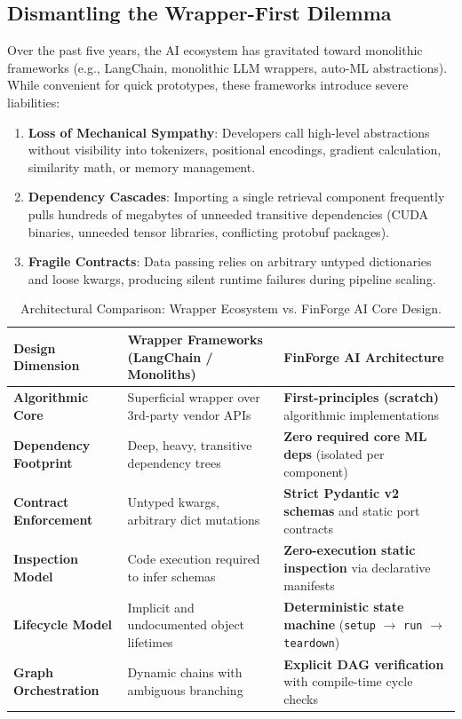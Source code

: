\documentclass[11pt,a4paper]{article}
\begin{document}
\subsection{Dismantling the Wrapper-First Dilemma}
Over the past five years, the AI ecosystem has gravitated toward monolithic frameworks (e.g., LangChain, monolithic LLM wrappers, auto-ML abstractions). While convenient for quick prototypes, these frameworks introduce severe liabilities:
\begin{enumerate}[leftmargin=1.5em, itemsep=2pt]
    \item \textbf{Loss of Mechanical Sympathy}: Developers call high-level abstractions without visibility into tokenizers, positional encodings, gradient calculation, similarity math, or memory management.
    \item \textbf{Dependency Cascades}: Importing a single retrieval component frequently pulls hundreds of megabytes of unneeded transitive dependencies (CUDA binaries, unneeded tensor libraries, conflicting protobuf packages).
    \item \textbf{Fragile Contracts}: Data passing relies on arbitrary untyped dictionaries and loose kwargs, producing silent runtime failures during pipeline scaling.
\end{enumerate}

\begin{table}[h!]
\centering
\small
\begin{tabularx}{\textwidth}{p{3.2cm} X X}
\toprule
\textbf{Design Dimension} & \textbf{Wrapper Frameworks (LangChain / Monoliths)} & \textbf{FinForge AI Architecture} \\
\midrule
\textbf{Algorithmic Core} & Superficial wrapper over 3rd-party vendor APIs & \textbf{First-principles (scratch)} algorithmic implementations \\
\textbf{Dependency Footprint} & Deep, heavy, transitive dependency trees & \textbf{Zero required core ML deps} (isolated per component) \\
\textbf{Contract Enforcement} & Untyped kwargs, arbitrary dict mutations & \textbf{Strict Pydantic v2 schemas} and static port contracts \\
\textbf{Inspection Model} & Code execution required to infer schemas & \textbf{Zero-execution static inspection} via declarative manifests \\
\textbf{Lifecycle Model} & Implicit and undocumented object lifetimes & \textbf{Deterministic state machine} (\texttt{setup} $\rightarrow$ \texttt{run} $\rightarrow$ \texttt{teardown}) \\
\textbf{Graph Orchestration} & Dynamic chains with ambiguous branching & \textbf{Explicit DAG verification} with compile-time cycle checks \\
\bottomrule
\end{tabularx}
\caption{Architectural Comparison: Wrapper Ecosystem vs. FinForge AI Core Design.}
\label{tab:comparison}
\end{table}
\end{document}
